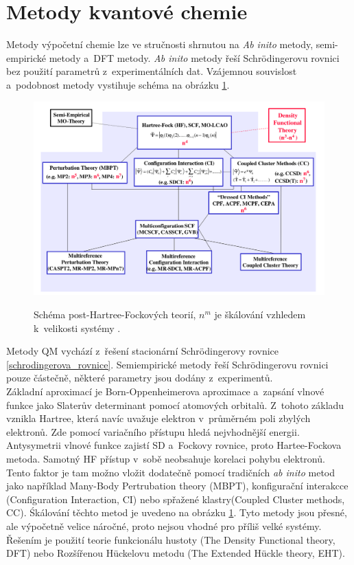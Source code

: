 \documentclass[
  printed, %
  table,   %
  lof,     %
  lot,     %
  oneside,
]{fithesis3}
\begin{document}
\section{Metody kvantové chemie}
Metody výpočetní chemie lze ve stručnosti shrnutou na \textit{Ab inito} metody, semi-empirické metody a~DFT metody. \textit{Ab inito} metody řeší Schrödingerovu rovnici bez použití parametrů z~experimentálních dat.  Vzájemnou souvislost a~podobnost metody vystihuje schéma na obrázku \ref{schema_QM}.
 \begin{figure}[h]
\caption{Schéma post-Hartree-Fockových teorií, $n^m$ je škálování vzhledem k~velikosti systémy \cite{pdf_obrazek}. }
  \center
  \includegraphics[width=12cm]{schema_QM.png}
  \label{schema_QM}
  \end{figure}
  Metody QM vychází z~řešení stacionární Schrödingerovy rovnice \ref{schrodingerova_rovnice}. Semiempirické metody řeší Schrödingerovu rovnici pouze částečně, některé parametry jsou dodány z~experimentů. \\
     Základní aproximací je Born-Oppenheimerova aproximace a~zapsání vlnové funkce jako Slaterův determinant pomocí atomových orbitalů. Z~tohoto základu vznikla Hartree, která navíc uvažuje elektron v~průměrném poli zbylých elektronů. Zde pomocí variačního přístupu hledá nejvhodnější energii. Antysymetrii vlnové funkce zajistí SD a~Fockovy rovnice, proto Hartee-Fockova metoda. Samotný HF přístup v~sobě neobsahuje korelaci pohybu elektronů. Tento faktor je tam možno vložit dodatečně pomocí tradičních \textit{ab inito} metod jako například Many-Body Pertrubation  theory (MBPT), konfigurační interakcce (Configuration Interaction, CI) nebo spřažené klastry(Coupled Cluster methods, CC). Śkálování těchto metod je uvedeno na obrázku \ref{schema_QM}. Tyto metody jsou přesné, ale výpočetně velice náročné, proto nejsou vhodné pro příliš velké systémy. Řešením je použití teorie funkcionálu hustoty (The Density Functional theory, DFT) nebo Rozšířenou Hückelovu metodu (The Extended Hückle theory, EHT).
\end{document}
